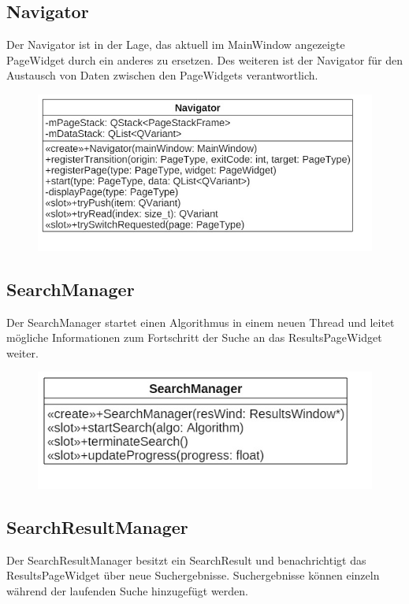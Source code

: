 \subsection*{Navigator}
Der Navigator ist in der Lage, das aktuell im MainWindow angezeigte PageWidget durch ein anderes zu ersetzen. Des weiteren ist der Navigator für den Austausch von Daten zwischen den PageWidgets verantwortlich.

\begin{figure}[H]
\centering
\includegraphics[scale=0.5]{img/Klassendiagramm/Klassen/Controller/Navigator}
\label{fig:navigator}
\end{figure}

\subsection*{SearchManager}
Der SearchManager startet einen Algorithmus in einem neuen Thread und leitet mögliche Informationen zum Fortschritt der Suche an das ResultsPageWidget weiter.

\begin{figure}[H]
\centering
\includegraphics[scale=0.5]{img/Klassendiagramm/Klassen/Controller/SearchManager}
\label{fig:searchManager}
\end{figure}

\subsection*{SearchResultManager}
Der SearchResultManager besitzt ein SearchResult und benachrichtigt das ResultsPageWidget über neue Suchergebnisse. Suchergebnisse können einzeln während der laufenden Suche hinzugefügt werden.

